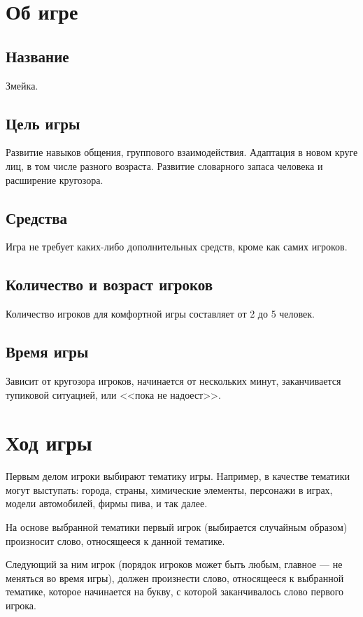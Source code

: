 \setcounter{page}{3}

\chapter{Об игре}

\section{Название}
Змейка.

\section{Цель игры}
Развитие навыков общения, группового взаимодействия. Адаптация в новом круге лиц, в том числе разного возраста. Развитие словарного запаса человека и расширение кругозора.

\section{Средства}
Игра не требует каких-либо дополнительных средств, кроме как самих игроков.

\section{Количество и возраст игроков}
Количество игроков для комфортной игры составляет от 2 до 5 человек.

\section{Время игры}
Зависит от кругозора игроков, начинается от нескольких минут, заканчивается тупиковой ситуацией, или <<пока не надоест>>.

\chapter{Ход игры}
Первым делом игроки выбирают тематику игры. Например, в качестве тематики могут выступать: города, страны, химические элементы, персонажи в играх, модели автомобилей, фирмы пива, и так далее.

На основе выбранной тематики первый игрок (выбирается случайным образом) произносит слово, относящееся к данной тематике.

Следующий за ним игрок (порядок игроков может быть любым, главное --- не меняться во время игры), должен произнести слово, относящееся к выбранной тематике, которое начинается на букву, с которой заканчивалось слово первого игрока.

